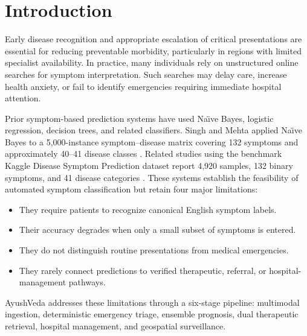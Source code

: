 \documentclass[conference]{IEEEtran}
\begin{document}
\section{Introduction}
Early disease recognition and appropriate escalation of critical presentations are essential for reducing preventable morbidity, particularly in regions with limited specialist availability. In practice, many individuals rely on unstructured online searches for symptom interpretation. Such searches may delay care, increase health anxiety, or fail to identify emergencies requiring immediate hospital attention.

Prior symptom-based prediction systems have used Na{\"\i}ve Bayes, logistic regression, decision trees, and related classifiers. Singh and Mehta applied Na{\"\i}ve Bayes to a 5,000-instance symptom--disease matrix covering 132 symptoms and approximately 40--41 disease classes \cite{singh2023disease}. Related studies using the benchmark Kaggle Disease Symptom Prediction dataset report 4,920 samples, 132 binary symptoms, and 41 disease categories \cite{kaggleDataset}. These systems establish the feasibility of automated symptom classification but retain four major limitations:
\begin{itemize}
    \item They require patients to recognize canonical English symptom labels.
    \item Their accuracy degrades when only a small subset of symptoms is entered.
    \item They do not distinguish routine presentations from medical emergencies.
    \item They rarely connect predictions to verified therapeutic, referral, or hospital-management pathways.
\end{itemize}

AyushVeda addresses these limitations through a six-stage pipeline: multimodal ingestion, deterministic emergency triage, ensemble prognosis, dual therapeutic retrieval, hospital management, and geospatial surveillance.
\end{document}
